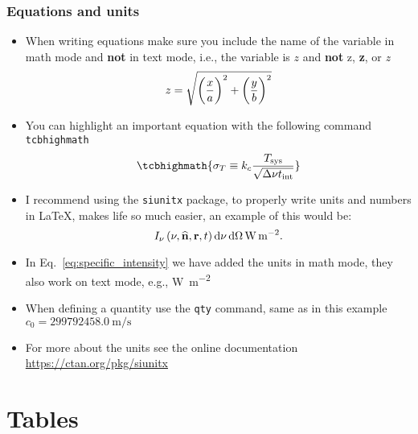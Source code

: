\documentclass[
    10pt,
    aspectratio=169,
    xcolor={dvipsnames},
    spanish,
    ]{beamer}
\begin{document}
\begin{frame}
  \frametitle{Equations and units}
  \small
  \begin{itemize}
    \item When writing equations make sure you include the name of the variable in math mode and \textbf{not} in text mode, i.e., the variable is $z$ and \textbf{not} z, \textbf{z}, or \textit{z}
    \begin{equation}
      z = \sqrt{\del{\frac{x}{a}}^2 + \del{\frac{y}{b}}^2}
    \end{equation}
    \item You can highlight an important equation with the following command \texttt{tcbhighmath}
    \begin{equation}
      \tcbhighmath{\sigma_T \equiv k_c \frac{T_\text{sys}}{\sqrt{\Delta\nu t_\text{int}}}}
    \end{equation}
    \item I recommend using the \texttt{siunitx} package, to properly write units and numbers in \LaTeX, makes life so much easier, an example of this would be:
    \begin{equation}
        I_\nu\del{\nu,\widehat{\mathbf{n}}, \mathbf{r}, t}\dif\nu\dif\Omega \, \unit{\watt\per\m\squared}.
        \label{eq:specific_intensity}
    \end{equation}
    \item In Eq.~\eqref{eq:specific_intensity} we have added the units in math mode, they also work on text mode, e.g., \unit{\watt\per\m\squared}
    \item When defining a quantity use the \texttt{qty} command, same as in this example $c_0 = \qty{299792458.0}{\m\per\s}$
    \item For more about the units see the online documentation \url{https://ctan.org/pkg/siunitx}
  \end{itemize}
\end{frame}

\section{Tables}
\end{document}
